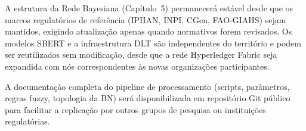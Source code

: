 A estrutura da Rede Bayesiana (Capítulo~5) permanecerá estável desde que os marcos regulatórios de referência (IPHAN, INPI, CGen, FAO-GIAHS) sejam mantidos, exigindo atualização apenas quando normativos forem revisados. Os modelos SBERT e a infraestrutura DLT são independentes do território e podem ser reutilizados sem modificação, desde que a rede Hyperledger Fabric seja expandida com nós correspondentes às novas organizações participantes.

A documentação completa do pipeline de processamento (scripts, parâmetros, regras fuzzy, topologia da BN) será disponibilizada em repositório Git público para facilitar a replicação por outros grupos de pesquisa ou instituições regulatórias.
